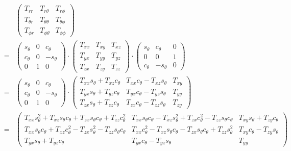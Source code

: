 \documentclass[a4paper,12pt]{article}
\newcommand{\nn}{\nonumber}
\begin{document}
\begin{eqnarray}
&&\left(
\begin{array}{ccc}
T_{rr}       & T_{r\theta}      & T_{r\phi} \\
T_{\theta r} & T_{\theta\theta} & T_{\theta\phi} \\
T_{\phi r}   & T_{\phi \theta}  & T_{\phi\phi}
\end{array}
\right) \nn\\
&=&
\left(
\begin{array}{ccc}
s_\theta  & 0 & c_\theta \\
c_\theta  & 0 & -s_\theta \\
0 & 1 & 0 
\end{array}
\right)
\cdot
\left(
\begin{array}{ccc}
T_{xx} & T_{xy} & T_{xz} \\
T_{yx} & T_{yy} & T_{yz} \\
T_{zx} & T_{zy} & T_{zz} 
\end{array}
\right)
\cdot
\left(
\begin{array}{ccc}
s_\theta & c_\theta & 0 \\
0 & 0 & 1 \\
c_\theta & -s_\theta & 0
\end{array}
\right)
\nn\\
&=&
\left(
\begin{array}{ccc}
s_\theta  & 0 & c_\theta \\
c_\theta  & 0 & -s_\theta \\
0 & 1 & 0 
\end{array}
\right)
\cdot
\left(
\begin{array}{ccc}
T_{xx} s_\theta  + T_{xz}c_\theta & T_{xx} c_\theta  - T_{xz}s_\theta  & T_{xy} \\
T_{yx} s_\theta  + T_{yz}c_\theta & T_{yx} c_\theta  - T_{yz}s_\theta  & T_{yy} \\
T_{zx} s_\theta  + T_{zz}c_\theta & T_{zx} c_\theta  - T_{zz}s_\theta  & T_{zy} 
\end{array}
\right)
\nn\\
&=&
\left(
\begin{array}{ccc}
T_{xx} s^2_\theta  + T_{xz}s_\theta c_\theta + T_{zx} s_\theta c_\theta  + T_{zz}c^2_\theta &
T_{xx} s_\theta c_\theta  - T_{xz}s^2_\theta      +    T_{zx} c^2_\theta  - T_{zz}s_\theta  c_\theta &
T_{xy} s_\theta  + T_{zy} c_\theta 
\\
T_{xx} s_\theta c_\theta + T_{xz}c^2_\theta - T_{zx} s^2_\theta  - T_{zz}s_\theta c_\theta &
T_{xx} c^2_\theta  - T_{xz}s_\theta c_\theta - T_{zx} s_\theta c_\theta  + T_{zz}s^2_\theta & 
T_{xy} c_\theta  - T_{zy}  s_\theta 
\\ 
T_{yx} s_\theta  + T_{yz}c_\theta & T_{yx} c_\theta  - T_{yz}s_\theta  & T_{yy}
\end{array}
\right) \nn
\end{eqnarray}
\end{document}
